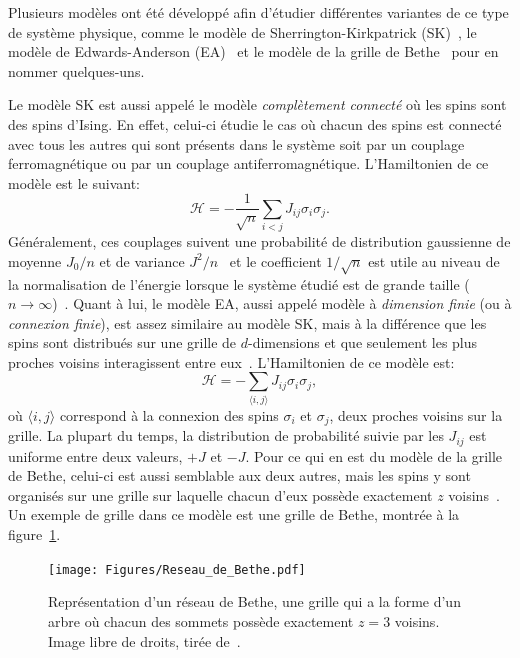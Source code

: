 Plusieurs modèles ont été développé afin d'étudier différentes variantes de ce type de système physique, comme le modèle de Sherrington-Kirkpatrick (SK)~\cite{SKspinglass}, le modèle de Edwards-Anderson (EA)~\cite{EAspinglass} et le modèle de la grille de Bethe~\cite{Bethespinglass} pour en nommer quelques-uns. %

Le modèle SK est aussi appelé le modèle \emph{complètement connecté} où les spins sont des spins d'Ising.
En effet, celui-ci étudie le cas où chacun des spins est connecté avec tous les autres qui sont présents dans le système soit par un couplage ferromagnétique ou par un couplage antiferromagnétique.
L'Hamiltonien de ce modèle est le suivant:
\begin{equation}
    \mathcal{H} = -\frac{1}{\sqrt{n}}\sum_{i < j} J_{ij}\sigma_i\sigma_j.
\end{equation}
Généralement, ces couplages suivent une probabilité de distribution gaussienne de moyenne $J_0 / n$ et de variance $J^2 / n$~\cite{rodriguez2021sherrington} et le coefficient $1/\sqrt{n}$ est utile au niveau de la normalisation de l'énergie lorsque le système étudié est de grande taille ($n \rightarrow \infty$)~\cite{stein2013spin}.
Quant à lui, le modèle EA, aussi appelé modèle à \emph{dimension finie} (ou à \emph{connexion finie}), est assez similaire au modèle SK, mais à la différence que les spins sont distribués sur une grille de $d$-dimensions et que seulement les plus proches voisins interagissent entre eux~\cite{stein2013spin}.
L'Hamiltonien de ce modèle est:
\begin{equation}
    \mathcal{H} = -\sum_{\langle i, j \rangle} J_{ij}\sigma_i\sigma_j,
\end{equation}
où $\langle i, j \rangle$ correspond à la connexion des spins $\sigma_i$ et $\sigma_j$, deux proches voisins sur la grille.
La plupart du temps, la distribution de probabilité suivie par les $J_{ij}$ est uniforme entre deux valeurs, $+J$ et $-J$\cite{stein2013spin}.
Pour ce qui en est du modèle de la grille de Bethe, celui-ci est aussi semblable aux deux autres, mais les spins y sont organisés sur une grille sur laquelle chacun d'eux possède exactement $z$ voisins~\cite{viana1985phase}.
Un exemple de grille dans ce modèle est une grille de Bethe, montrée à la figure~\ref{fig:bethe-lattice}.
\begin{figure}[h]
    \centering
    \texttt{[image: Figures/Reseau\_de\_Bethe.pdf]}
    \caption[Représentation d'un réseau de Bethe avec $z = 3$ voisins.]{Représentation d'un réseau de Bethe, une grille qui a la forme d'un arbre où chacun des sommets possède exactement $z = 3$ voisins. Image libre de droits, tirée de~\protect\cite{wiki:Bethe-lattice}.}
    \label{fig:bethe-lattice}
\end{figure}

